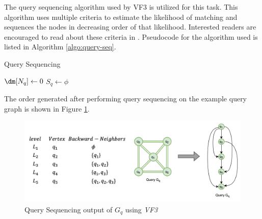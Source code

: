 The query sequencing algorithm used by VF3 \cite{VF3} is utilized for this task. This algorithm uses multiple criteria to estimate the likelihood of matching and sequences the nodes in decreasing order of that likelihood. Interested readers are encouraged to read about these criteria in \cite{VF3}. Pseudocode for the algorithm used is listed in Algorithm \ref{algo:query-seq}.

\begin{algorithm}[h]
    \caption{Query Sequencing}
    \label{algo:query-seq}



    $\dm[N_q] \leftarrow 0$\;
    $S_q \leftarrow \phi$\;
\end{algorithm}

The order generated after performing query sequencing on the example query graph is shown in Figure \ref{fig:query-sequencing}.

\begin{figure}
    \includegraphics[width=\textwidth]{fig/LR/query-sequencing.png}
    \caption{Query Sequencing output of $G_q$ using \textit{VF3}}
    \label{fig:query-sequencing}
\end{figure}


